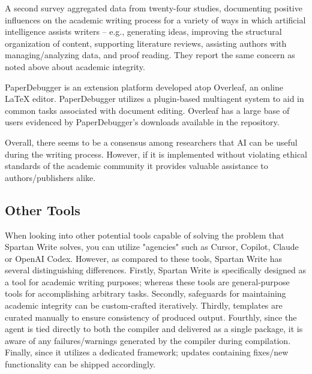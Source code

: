 A second survey aggregated data from twenty-four studies, documenting positive influences on the academic writing process for a variety of ways in which artificial intelligence assists writers -- e.g., generating ideas, improving the structural organization of content, supporting literature reviews, assisting authors with managing/analyzing data, and proof reading. 
They report the same concern as noted above about academic integrity.

PaperDebugger \cite{paperdebugger} is an extension platform developed atop Overleaf, an online LaTeX editor. 
PaperDebugger utilizes a plugin-based multiagent system to aid in common tasks associated with document editing. 
Overleaf has a large base of users evidenced by PaperDebugger's downloads available in the repository.

Overall, there seems to be a consensus among researchers that AI can be useful during the writing process. 
However, if it is implemented without violating ethical standards of the academic community it provides valuable assistance to authors/publishers alike.

\subsection{Other Tools}

When looking into other potential tools capable of solving the problem that Spartan Write solves, you can utilize "agencies" such as Cursor, Copilot, Claude or OpenAI Codex. 
However, as compared to these tools, Spartan Write has several distinguishing differences. 
Firstly, Spartan Write is specifically designed as a tool for academic writing purposes; whereas these tools are general-purpose tools for accomplishing arbitrary tasks. 
Secondly, safeguards for maintaining academic integrity can be custom-crafted iteratively. 
Thirdly, templates are curated manually to ensure consistency of produced output. 
Fourthly, since the agent is tied directly to both the compiler and delivered as a single package, it is aware of any failures/warnings generated by the compiler during compilation. 
Finally, since it utilizes a dedicated framework; updates containing fixes/new functionality can be shipped accordingly.
